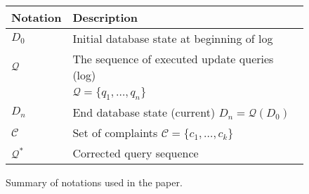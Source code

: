 
\begin{figure}[t]
\centering
{\small
\begin{tabular}{ll}
    \toprule
    \textbf{Notation} & \textbf{Description}\\
    \midrule
    $D_0$    & Initial database state at beginning of log\\
    $\mathcal{Q}$& The sequence of executed update queries (log)\\ 
             & $\mathcal{Q}=\{q_1, \dots, q_n\}$ \\
    $D_n$    & End database state (current) $D_n=\mathcal{Q}(D_0)$\\
    $\mathcal{C}$ & Set of complaints $\mathcal{C}=\{c_1,\dots,c_k\}$\\
    $\mathcal{Q}^*$& Corrected query sequence \\
    \bottomrule
\end{tabular}
}
\caption{Summary of notations used in the paper.}
\label{tbl:notation}
\end{figure}